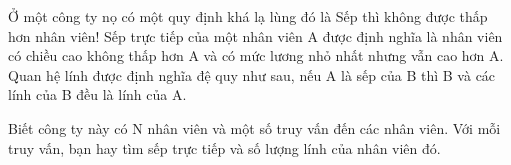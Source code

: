 Ở một công ty nọ có một quy định khá lạ lùng đó là Sếp thì không được thấp hơn nhân viên! Sếp trực tiếp của một nhân viên A được định nghĩa là nhân viên có chiều cao không thấp hơn A và có mức lương nhỏ nhất nhưng vẫn cao hơn A. Quan hệ lính được định nghĩa đệ quy như sau, nếu A là sếp của B thì B và các lính của B đều là lính của A.  

   Biết công ty này có N nhân viên và một số truy vấn đến các nhân viên. Với mỗi truy vấn, bạn hay tìm sếp trực tiếp và số lượng lính của nhân viên đó.